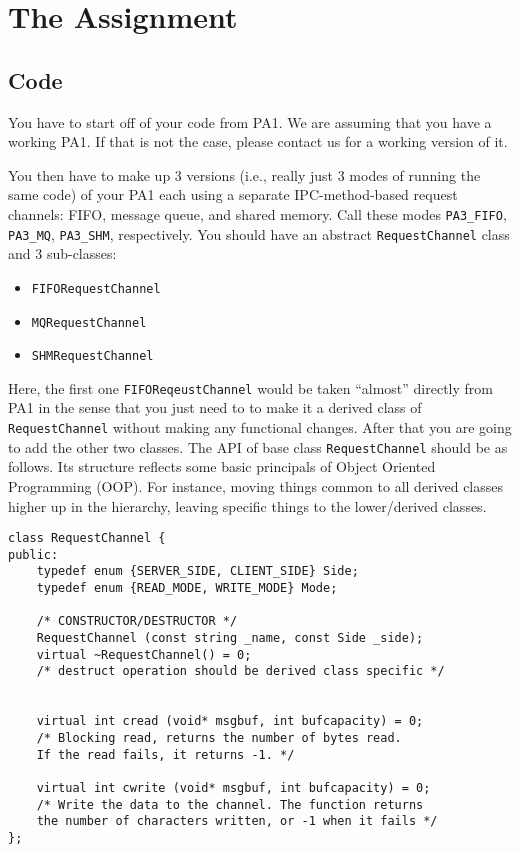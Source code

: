 \documentclass[12pt]{extarticle}
\begin{document}
\section*{The Assignment}
\subsection*{Code}
You have to start off of your code from PA1. We are assuming that you have a working PA1. If that is not the case, please contact us for a working version of it. 

You then have to make up 3 versions (i.e., really just 3 modes of running the same code) of your PA1 each using a separate IPC-method-based request channels: FIFO, message queue, and shared memory. Call these modes \texttt{PA3\_FIFO}, \texttt{PA3\_MQ}, \texttt{PA3\_SHM}, respectively. You should have an abstract \texttt{RequestChannel} class and 3 sub-classes: 
\begin{itemize}
	\item \texttt{FIFORequestChannel}
	\item \texttt{MQRequestChannel}
	\item \texttt{SHMRequestChannel}
\end{itemize}
Here, the first one \texttt{FIFOReqeustChannel} would be taken ``almost'' directly from PA1 in the sense that you just need to to make it a derived class of \texttt{RequestChannel} without making any functional changes. After that you are going to add the other two classes. The API of base class \texttt{RequestChannel} should be as follows. Its structure reflects some basic principals of Object Oriented Programming (OOP). For instance, moving things common to all derived classes higher up in the hierarchy, leaving specific things to the lower/derived classes.

\begin{lstlisting}[style=C++]
class RequestChannel {
public:
    typedef enum {SERVER_SIDE, CLIENT_SIDE} Side; 
    typedef enum {READ_MODE, WRITE_MODE} Mode;

    /* CONSTRUCTOR/DESTRUCTOR */
    RequestChannel (const string _name, const Side _side);
    virtual ~RequestChannel() = 0; 
    /* destruct operation should be derived class specific */


    virtual int cread (void* msgbuf, int bufcapacity) = 0;
    /* Blocking read, returns the number of bytes read. 
    If the read fails, it returns -1. */
	
	virtual int cwrite (void* msgbuf, int bufcapacity) = 0;
    /* Write the data to the channel. The function returns
    the number of characters written, or -1 when it fails */
};
\end{lstlisting}
\end{document}
